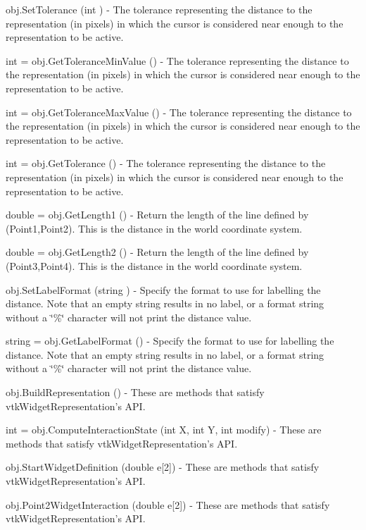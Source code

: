 \begin{DoxyItemize}
\item {\ttfamily obj.\-Set\-Tolerance (int )} -\/ The tolerance representing the distance to the representation (in pixels) in which the cursor is considered near enough to the representation to be active.  
\item {\ttfamily int = obj.\-Get\-Tolerance\-Min\-Value ()} -\/ The tolerance representing the distance to the representation (in pixels) in which the cursor is considered near enough to the representation to be active.  
\item {\ttfamily int = obj.\-Get\-Tolerance\-Max\-Value ()} -\/ The tolerance representing the distance to the representation (in pixels) in which the cursor is considered near enough to the representation to be active.  
\item {\ttfamily int = obj.\-Get\-Tolerance ()} -\/ The tolerance representing the distance to the representation (in pixels) in which the cursor is considered near enough to the representation to be active.  
\item {\ttfamily double = obj.\-Get\-Length1 ()} -\/ Return the length of the line defined by (Point1,Point2). This is the distance in the world coordinate system.  
\item {\ttfamily double = obj.\-Get\-Length2 ()} -\/ Return the length of the line defined by (Point3,Point4). This is the distance in the world coordinate system.  
\item {\ttfamily obj.\-Set\-Label\-Format (string )} -\/ Specify the format to use for labelling the distance. Note that an empty string results in no label, or a format string without a \char`\"{}\%\char`\"{} character will not print the distance value.  
\item {\ttfamily string = obj.\-Get\-Label\-Format ()} -\/ Specify the format to use for labelling the distance. Note that an empty string results in no label, or a format string without a \char`\"{}\%\char`\"{} character will not print the distance value.  
\item {\ttfamily obj.\-Build\-Representation ()} -\/ These are methods that satisfy vtk\-Widget\-Representation's A\-P\-I.  
\item {\ttfamily int = obj.\-Compute\-Interaction\-State (int X, int Y, int modify)} -\/ These are methods that satisfy vtk\-Widget\-Representation's A\-P\-I.  
\item {\ttfamily obj.\-Start\-Widget\-Definition (double e\mbox{[}2\mbox{]})} -\/ These are methods that satisfy vtk\-Widget\-Representation's A\-P\-I.  
\item {\ttfamily obj.\-Point2\-Widget\-Interaction (double e\mbox{[}2\mbox{]})} -\/ These are methods that satisfy vtk\-Widget\-Representation's A\-P\-I.  

\end{DoxyItemize}

